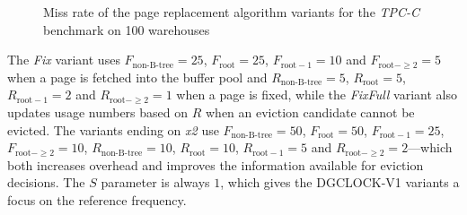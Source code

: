\begin{@empty}
        \begin{figure}[t]
            \centering
            \caption[Miss rate of DGCLOCK-V1 variants]{Miss rate of the  page replacement algorithm variants for the \textit{TPC-C} benchmark on 100 warehouses}
            \label{fig:dgclockv1hitrate}
        \end{figure}
    \end{@empty}
    
    The \emph{Fix} variant uses $F_{\text{non-B-tree}} = 25$, $F_{\text{root}} = 25$, $F_{\text{root} - 1} = 10$ and $F_{\text{root} - \geq 2} = 5$ when a page is fetched into the buffer pool and $R_{\text{non-B-tree}} = 5$, $R_{\text{root}} = 5$, $R_{\text{root} - 1} = 2$ and $R_{\text{root} - \geq 2} = 1$ when a page is fixed, while the \emph{FixFull} variant also updates usage numbers based on $R$ when an eviction candidate cannot be evicted. The variants ending on \emph{x2} use $F_{\text{non-B-tree}} = 50$, $F_{\text{root}} = 50$, $F_{\text{root} - 1} = 25$, $F_{\text{root} - \geq 2} = 10$, $R_{\text{non-B-tree}} = 10$, $R_{\text{root}} = 10$, $R_{\text{root} - 1} = 5$ and $R_{\text{root} - \geq 2} = 2$---which both increases overhead and improves the information available for eviction decisions. The $S$ parameter is always $1$, which gives the DGCLOCK-V1 variants a focus on the reference frequency.

